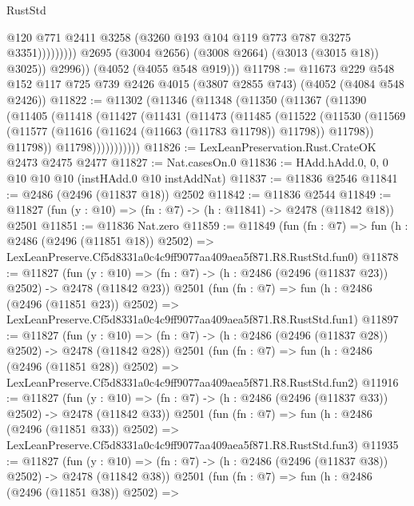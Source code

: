 \begin{lexlean}{RustStd}
\begin{coremodule}
                              @120
                              @771
                              @2411
                              @3258
                              (@3260 @193 @104 @119 @773 @787 @3275 @3351)))))))))
              @2695
              (@3004 @2656)
              (@3008 @2664)
              (@3013 (@3015 @18))
              @3025))
          @2996))
      (@4052 (@4055 @548 @919)))
@11798 := @11673
    @229
    @548
    @152
    @117
    @725
    @739
    @2426
    @4015
    (@3807 @2855 @743)
    (@4052 (@4084 @548 @2426))
@11822 := @11302
    (@11346
      (@11348
        (@11350
          (@11367
            (@11390
              (@11405
                (@11418
                  (@11427
                    (@11431
                      (@11473
                        (@11485
                          (@11522
                            (@11530
                              (@11569
                                (@11577 (@11616 (@11624 (@11663 (@11783 @11798)) @11798)) @11798))
                              @11798))
                          @11798)))))))))))
@11826 := LexLeanPreservation.Rust.CrateOK @2473 @2475 @2477
@11827 := Nat.casesOn.{0}
@11836 := HAdd.hAdd.{0, 0, 0} @10 @10 @10 (instHAdd.{0} @10 instAddNat)
@11837 := @11836 @2546
@11841 := @2486 (@2496 (@11837 @18)) @2502
@11842 := @11836 @2544
@11849 := @11827 (fun (y : @10) => (fn : @7) -> (h : @11841) -> @2478 (@11842 @18)) @2501
@11851 := @11836 Nat.zero
@11859 := @11849
    (fun (fn : @7) =>
    fun (h : @2486 (@2496 (@11851 @18)) @2502) =>
    LexLeanPreserve.Cf5d8331a0c4c9ff9077aa409aea5f871.R8.RustStd.fun0)
@11878 := @11827
    (fun (y : @10) => (fn : @7) -> (h : @2486 (@2496 (@11837 @23)) @2502) -> @2478 (@11842 @23))
    @2501
    (fun (fn : @7) =>
    fun (h : @2486 (@2496 (@11851 @23)) @2502) =>
    LexLeanPreserve.Cf5d8331a0c4c9ff9077aa409aea5f871.R8.RustStd.fun1)
@11897 := @11827
    (fun (y : @10) => (fn : @7) -> (h : @2486 (@2496 (@11837 @28)) @2502) -> @2478 (@11842 @28))
    @2501
    (fun (fn : @7) =>
    fun (h : @2486 (@2496 (@11851 @28)) @2502) =>
    LexLeanPreserve.Cf5d8331a0c4c9ff9077aa409aea5f871.R8.RustStd.fun2)
@11916 := @11827
    (fun (y : @10) => (fn : @7) -> (h : @2486 (@2496 (@11837 @33)) @2502) -> @2478 (@11842 @33))
    @2501
    (fun (fn : @7) =>
    fun (h : @2486 (@2496 (@11851 @33)) @2502) =>
    LexLeanPreserve.Cf5d8331a0c4c9ff9077aa409aea5f871.R8.RustStd.fun3)
@11935 := @11827
    (fun (y : @10) => (fn : @7) -> (h : @2486 (@2496 (@11837 @38)) @2502) -> @2478 (@11842 @38))
    @2501
    (fun (fn : @7) =>
    fun (h : @2486 (@2496 (@11851 @38)) @2502) =>

\end{coremodule}
\end{lexlean}
